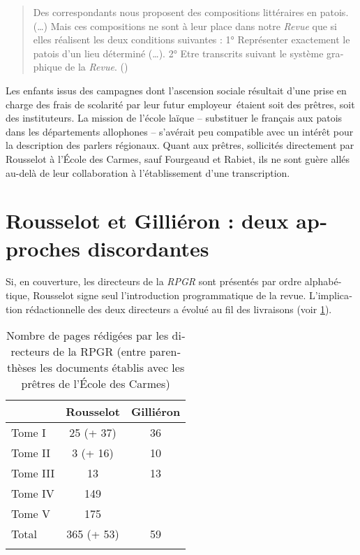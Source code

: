 \documentclass[french,output=paper,colorlinks,citecolor=brown]{../langscibook}
\begin{document}
\begin{otherlanguage}{french}
\begin{quote}
    Des correspondants nous proposent des compositions littéraires en patois. (…) Mais ces compositions ne sont à leur place dans notre \textit{Revue} que si elles réalisent les deux conditions suivantes : 1° Représenter exactement le patois d’un lieu déterminé (…). 2° Etre transcrits suivant le système graphique de la \textit{Revue}. (\citealt[III-159]{Rousselot1887})
\end{quote}


Les enfants issus des campagnes dont l’ascension sociale résultait d’une prise en charge des frais de scolarité par leur futur employeur~étaient soit des prêtres, soit des instituteurs. La mission de l’école laïque – substituer le français aux patois dans les départements allophones – s’avérait peu compatible avec un intérêt pour la description des parlers régionaux. Quant aux prêtres, sollicités directement par Rousselot à l’École des Carmes, sauf Fourgeaud et Rabiet, ils ne sont guère allés au-delà de leur collaboration à l’établissement d’une transcription. 

\section{Rousselot et Gilliéron : deux approches discordantes}

Si, en couverture, les directeurs de la \textit{RPGR} sont présentés par ordre alphabétique, Rousselot signe seul l’introduction programmatique de la revue. L’implication rédactionnelle des deux directeurs a évolué au fil des livraisons (voir \ref{table: Tab.1}).

\begin{table}
\begin{tabular}{lcc}
\lsptoprule
          &    Rousselot    &    Gilliéron \\\midrule
Tome I   &   25  (+ 37)     &         36 \\
Tome II  &  3 (+ 16)           &    10 \\
Tome III  &  13       &         13 \\
Tome IV  &   149  & \\
Tome V  &  175      &    \\\midrule
Total   &   365 (+ 53)     &         59\\
\lspbottomrule 
\end{tabular}
\caption{Nombre de pages rédigées par les directeurs de la RPGR (entre parenthèses les documents établis avec les prêtres de l’École des Carmes)\label{table: Tab.1}}
\end{table}


\end{otherlanguage}
\end{document}
